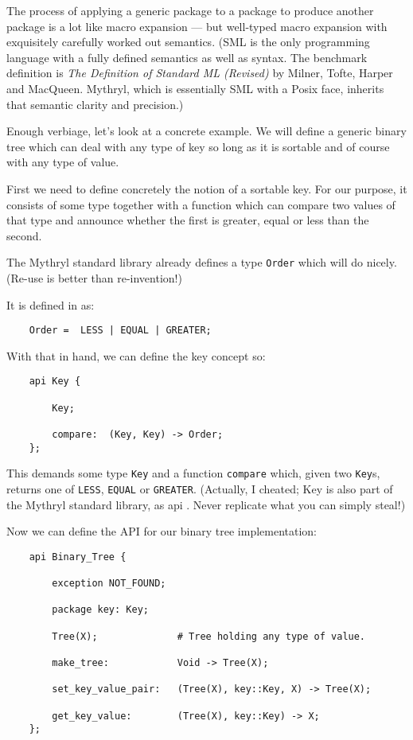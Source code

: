 The process of applying a generic package to a package to produce another package 
is a lot like macro expansion --- but well-typed macro expansion with 
exquisitely carefully worked out semantics.  (SML is the only programming 
language with a fully defined semantics as well as syntax.  The benchmark 
definition is {\it The Definition of Standard ML (Revised)} by Milner, 
Tofte, Harper and MacQueen.  Mythryl, which is essentially SML with a 
Posix face, inherits that semantic clarity and precision.)

Enough verbiage, let's look at a concrete example.  We will define a 
generic binary tree which can deal with any type of key so long as 
it is sortable and of course with any type of value.

First we need to define concretely the notion of a sortable key. 
For our purpose, it consists of some type together with 
a function which can compare two values of that type and announce whether 
the first is greater, equal or less than the second.

The Mythryl standard library already defines a type {\tt Order} 
which will do nicely.  (Re-use is better than re-invention!)

It is defined in  as:

\begin{verbatim}
    Order =  LESS | EQUAL | GREATER;
\end{verbatim}

With that in hand, we can define the key concept so:

\begin{verbatim}
    api Key {

        Key;

        compare:  (Key, Key) -> Order;
    };
\end{verbatim}

This demands some type {\tt Key} and a function {\tt compare} which, 
given two {\tt Key}s, returns one of {\tt LESS}, {\tt EQUAL} or 
{\tt GREATER}.  (Actually, I cheated;  Key is also part of the 
Mythryl standard library, as api . Never 
replicate what you can simply steal!)

Now we can define the API for our binary tree implementation:

\begin{verbatim}
    api Binary_Tree {

        exception NOT_FOUND;

        package key: Key;

        Tree(X);              # Tree holding any type of value.

        make_tree:            Void -> Tree(X);

        set_key_value_pair:   (Tree(X), key::Key, X) -> Tree(X);

        get_key_value:        (Tree(X), key::Key) -> X;
    };    
\end{verbatim}

